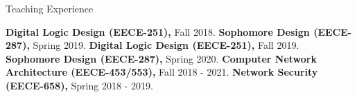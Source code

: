 \begin{rubric}{Teaching Experience}

%
\textbf{Digital Logic Design (EECE-251),} Fall 2018.
\entry*[]%
\textbf{Sophomore Design (EECE-287),} Spring 2019.
\entry*[]%
\textbf{Digital Logic Design (EECE-251),} Fall 2019.
\entry*[]%
\textbf{Sophomore Design (EECE-287),} Spring 2020.
%
%
\textbf{Computer Network Architecture (EECE-453/553),} Fall 2018 - 2021.
\entry*[]%
\textbf{Network Security (EECE-658),} Spring 2018 - 2019.
\end{rubric}